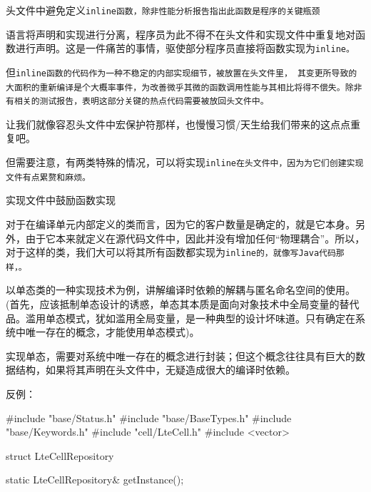 \begin{content}

\begin{regulation}
头文件中避免定义\tt{inline}函数，除非性能分析报告指出此函数是程序的关键瓶颈
\end{regulation}

\cpp{}语言将声明和实现进行分离，程序员为此不得不在头文件和实现文件中重复地对函数进行声明。这是一件痛苦的事情，驱使部分程序员直接将函数实现为\tt{inline}。

但\tt{inline}函数的代码作为一种不稳定的内部实现细节，被放置在头文件里，
其变更所导致的大面积的重新编译是个大概率事件，为改善微乎其微的函数调用性能与其相比将得不偿失。除非有相关的测试报告，表明这部分关键的热点代码需要被放回头文件中。

让我们就像容忍头文件中宏保护符那样，也慢慢习惯\clang{}/\cpp{}天生给我们带来的这点点重复吧。

但需要注意，有两类特殊的情况，可以将实现\tt{inline}在头文件中，因为为它们创建实现文件有点累赘和麻烦。

\begin{enum}
\end{enum}

\begin{regulation}
实现文件中鼓励函数实现
\end{regulation}

对于在编译单元内部定义的类而言，因为它的客户数量是确定的，就是它本身。另外，由于它本来就定义在源代码文件中，因此并没有增加任何“物理耦合”。所以，对于这样的类，我们大可以将其所有函数都实现为\tt{inline}的，就像写Java代码那样，。

以单态类的一种实现技术为例，讲解编译时依赖的解耦与匿名命名空间的使用。(首先，应该抵制单态设计的诱惑，单态其本质是面向对象技术中全局变量的替代品。滥用单态模式，犹如滥用全局变量，是一种典型的设计坏味道。只有确定在系统中唯一存在的概念，才能使用单态模式)。

实现单态，需要对系统中唯一存在的概念进行封装；但这个概念往往具有巨大的数据结构，如果将其声明在头文件中，无疑造成很大的编译时依赖。

反例：
\begin{leftbar}
\begin{c++}
#include "base/Status.h"
#include "base/BaseTypes.h"
#include "base/Keywords.h"
#include "cell/LteCell.h"
#include <vector>

struct LteCellRepository
{
    static LteCellRepository& getInstance();

}
\end{c++}
\end{leftbar}
\end{content}
